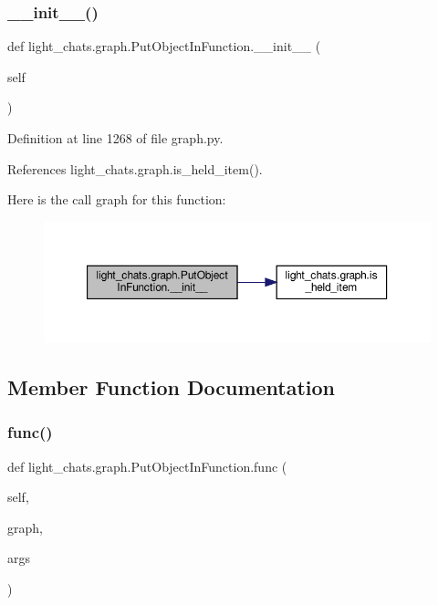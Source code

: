 \subsubsection{\texorpdfstring{\+\_\+\+\_\+init\+\_\+\+\_\+()}{\_\_init\_\_()}}
{\footnotesize\ttfamily def light\+\_\+chats.\+graph.\+Put\+Object\+In\+Function.\+\_\+\+\_\+init\+\_\+\+\_\+ (\begin{DoxyParamCaption}\item[{}]{self }\end{DoxyParamCaption})}



Definition at line 1268 of file graph.\+py.



References light\+\_\+chats.\+graph.\+is\+\_\+held\+\_\+item().

Here is the call graph for this function\+:
\nopagebreak
\begin{figure}[H]
\begin{center}
\leavevmode
\includegraphics[width=350pt]{classlight__chats_1_1graph_1_1PutObjectInFunction_aaf12273d36c38e856cd7dd10bbb90c83_cgraph}
\end{center}
\end{figure}


\subsection{Member Function Documentation}
\mbox{\label{classlight__chats_1_1graph_1_1PutObjectInFunction_a9f97c240b7308feca19fe4adb63a64f3}} 
\subsubsection{\texorpdfstring{func()}{func()}}
{\footnotesize\ttfamily def light\+\_\+chats.\+graph.\+Put\+Object\+In\+Function.\+func (\begin{DoxyParamCaption}\item[{}]{self,  }\item[{}]{graph,  }\item[{}]{args }\end{DoxyParamCaption})}

